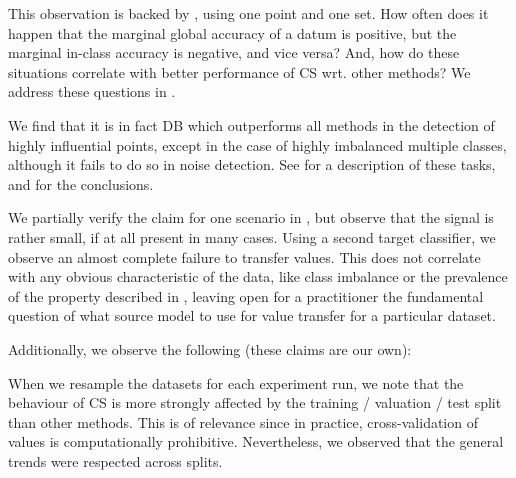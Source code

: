 \documentclass[10pt]{article}
\begin{document}
{}

This observation is backed by {\citetext{\citealp{schoch_csshapley_2022},
Figure~1}}, using one point and one set. How often does it happen that the
marginal global accuracy of a datum is positive, but the marginal in-class
accuracy is negative, and vice versa? And, how do these situations correlate
with better performance of CS wrt. other methods? We address these questions
in .

{}

We find that it is in fact DB which outperforms all methods in the detection
of highly influential points, except in the case of highly imbalanced multiple
classes, although it fails to do so in noise detection. See
 for a description of these tasks, and
 for the conclusions.

{}

We partially verify the claim for one scenario in ,
but observe that the signal is rather small, if at all present in many cases.
Using a second target classifier, we observe an almost complete failure to
transfer values. This does not correlate with any obvious characteristic of
the data, like class imbalance or the prevalence of the property described in
, leaving open for a practitioner the
fundamental question of what source model to use for value transfer for a
particular dataset.

Additionally, we observe the following (these claims are our own):

{}

When we resample the datasets for each experiment run, we note that the
behaviour of CS is more strongly affected by the training / valuation / test
split than other methods. This is of relevance since in practice,
cross-validation of values is computationally prohibitive. Nevertheless, we
observed that the general trends were respected across splits.
\end{document}
